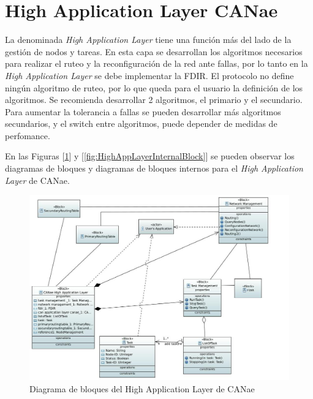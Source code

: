 \section{High Application Layer CANae}
La denominada \textit{High Application Layer} tiene una función más del lado de
la gestión de nodos y tareas. En esta capa se desarrollan los algoritmos
necesarios para realizar el ruteo y la reconfiguración de la red ante fallas,
por lo tanto en la \textit{High Application Layer} se debe implementar la
\ac{FDIR}. El protocolo no define ningún algoritmo de ruteo, por lo que queda
para el usuario la definición de los algoritmos. Se recomienda desarrollar 2
algoritmos, el primario y el secundario. Para aumentar la tolerancia a fallas
se pueden desarrollar más algoritmos secundarios, y el switch entre algoritmos,
puede depender de medidas de perfomance.

En las Figuras [\ref{fig:HighAppLayerBlock}] y
[\ref{fig:HighAppLayerInternalBlock}] se pueden observar los diagramas de
bloques y diagramas de bloques internos para el \textit{High Application
Layer} de CANae. 

\begin{figure}[h!]
 \centering
 \includegraphics[scale=0.4]{images/Secciones/AppendixA/CANae_High_App_Layer.JPG}
  \caption{Diagrama de bloques del High Application Layer de CANae}
\label{fig:HighAppLayerBlock}
\end{figure}

